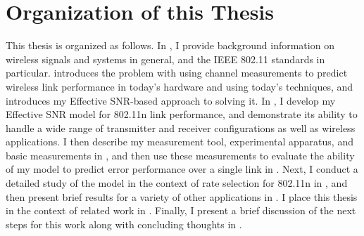 \section{Organization of this Thesis}
\label{sec:intro_organization}
This thesis is organized as follows. In , I provide background information on wireless signals and systems in general, and the IEEE 802.11 standards in particular.  introduces the problem with using channel measurements to predict wireless link performance in today's hardware and using today's techniques, and introduces my Effective SNR-based approach to solving it. In , I develop my Effective SNR model for 802.11n link performance, and demonstrate its ability to handle a wide range of transmitter and receiver configurations as well as wireless applications. I then describe my measurement tool, experimental apparatus, and basic measurements in , and then use these measurements to evaluate the ability of my model to predict error performance over a single link in . Next, I conduct a detailed study of the model in the context of rate selection for 802.11n in , and then present brief results for a variety of other applications in . I place this thesis in the context of related work in . Finally, I present a brief discussion of the next steps for this work along with concluding thoughts in .

\ifx\mainfile\undefined

\fi
